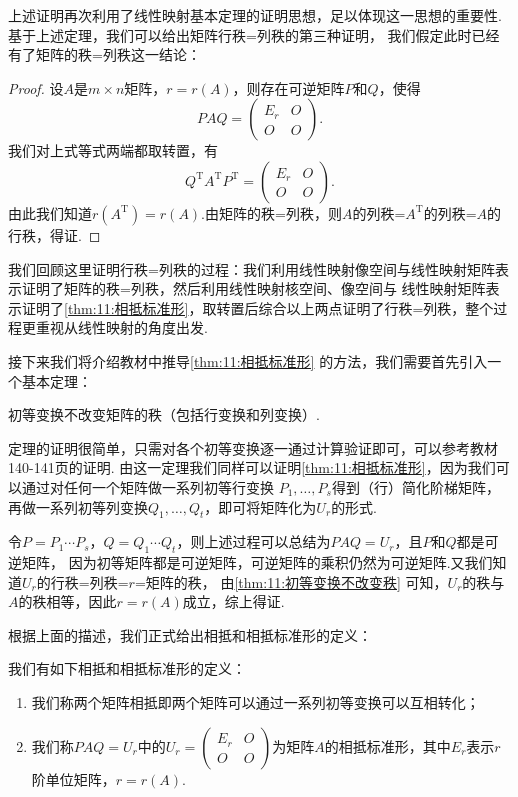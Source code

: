 上述证明再次利用了线性映射基本定理的证明思想，足以体现这一思想的重要性.基于上述定理，我们可以给出矩阵行秩=列秩的第三种证明，
我们假定此时已经有了矩阵的秩=列秩这一结论：

\begin{proof}
    设$A$是$m\times n$矩阵，$r=r(A)$，则存在可逆矩阵$P$和$Q$，使得
    \[PAQ=\begin{pmatrix}
        E_r & O \\ O & O
    \end{pmatrix}.\]
    我们对上式等式两端都取转置，有
    \[Q^\mathrm{T}A^\mathrm{T}P^\mathrm{T}=\begin{pmatrix}
        E_r & O \\ O & O
    \end{pmatrix}.\]
    由此我们知道$r(A^\mathrm{T})=r(A)$.由矩阵的秩=列秩，则$A$的列秩=$A^\mathrm{T}$的列秩=$A$的行秩，得证.
\end{proof}

我们回顾这里证明行秩=列秩的过程：我们利用线性映射像空间与线性映射矩阵表示证明了矩阵的秩=列秩，然后利用线性映射核空间、像空间与
线性映射矩阵表示证明了\autoref{thm:11:相抵标准形}，取转置后综合以上两点证明了行秩=列秩，整个过程更重视从线性映射的角度出发.

接下来我们将介绍教材中推导\autoref{thm:11:相抵标准形} 的方法，我们需要首先引入一个基本定理：
\begin{theorem}\label{thm:11:初等变换不改变秩}
    初等变换不改变矩阵的秩（包括行变换和列变换）.
\end{theorem}
定理的证明很简单，只需对各个初等变换逐一通过计算验证即可，可以参考教材140-141页的证明.
由这一定理我们同样可以证明\autoref{thm:11:相抵标准形}，因为我们可以通过对任何一个矩阵做一系列初等行变换
$P_1,\ldots,P_s$得到（行）简化阶梯矩阵，再做一系列初等列变换$Q_1,\ldots,Q_t$，即可将矩阵化为$U_r$的形式.

令$P=P_1\cdots P_s$，$Q=Q_1\cdots Q_t$，则上述过程可以总结为$PAQ=U_r$，且$P$和$Q$都是可逆矩阵，
因为初等矩阵都是可逆矩阵，可逆矩阵的乘积仍然为可逆矩阵.又我们知道$U_r$的行秩=列秩=$r$=矩阵的秩，
由\autoref{thm:11:初等变换不改变秩} 可知，$U_r$的秩与$A$的秩相等，因此$r=r(A)$成立，综上得证.

根据上面的描述，我们正式给出相抵和相抵标准形的定义：
\begin{definition}
    我们有如下相抵和相抵标准形的定义：
    \begin{enumerate}
        \item 我们称两个矩阵相抵即两个矩阵可以通过一系列初等变换可以互相转化；
        \item 我们称$PAQ=U_r$中的$U_r=\begin{pmatrix}
            E_r & O \\ O & O
        \end{pmatrix}$为矩阵$A$的相抵标准形，其中$E_r$表示$r$阶单位矩阵，$r=r(A)$.
    \end{enumerate}
\end{definition}

